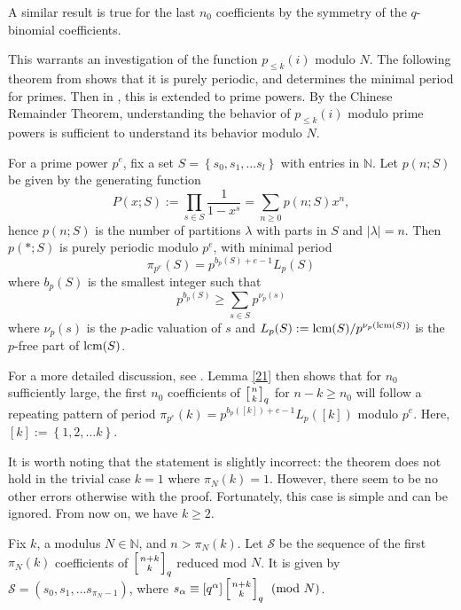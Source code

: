 \documentclass[12pt]{article}
\newcommand{\set}[1]{{\left\{{#1}\right\}}}
\newcommand{\N}{\mathbb{N}}
\newcommand{\qbinom}[2]{\left[{#1 \atop #2}\right]_q}
\newcommand{\eqdef}{:=}
\begin{document}
\begin{remark}
A similar result is true for the last $n_0$ coefficients by the symmetry of the $q$-binomial coefficients.
\end{remark}
This warrants an investigation of the function $p_{\le k}(i)$ modulo $N$. The following theorem from \cite{NijWilf} shows that it is purely periodic, and determines the minimal period for primes. Then in \cite{kwongpart}, this is extended to prime powers. By the Chinese Remainder Theorem, understanding the behavior of $p_{\le k}(i)$ modulo prime powers is sufficient to understand its behavior modulo $N$.

\begin{theorem}[Kwong]
For a prime power $p^e$, fix a set $S=\set{s_0, s_1, \ldots s_l}$ with entries in $\mathbb{N}$. Let $p(n;S)$ be given by the generating function
\[P(x;S) \eqdef \prod_{s\in S}{\frac{1}{1-x^s}} = \sum_{n\ge 0}{p(n;S)x^n},\]
hence $p(n;S)$ is the number of partitions $\lambda$ with parts in $S$ and $|\lambda |=n$. Then $p(*;S)$ is purely periodic modulo $p^e$, with minimal period 
\[\pi_{p^e}(S) = p^{b_p(S)+e-1} L_p(S)\] 
where $b_p(S)$ is the smallest integer such that 
\[p^{b_p(S)} \ge \sum_{s\in S}{p^{\nu_p(s)}}\]
where $\nu_p(s)$ is the $p$-adic valuation of $s$ and $L_p(S)\eqdef \textup{lcm}(S)/p^{\nu_p(\textup{lcm}(S))}$ is the $p$-free part of $\textup{lcm}(S)$.
\label{22}
\end{theorem}
For a more detailed discussion, see \cite{kwongpart}. Lemma \ref{21} then shows that for $n_0$ sufficiently large, the first $n_0$ coefficients of $\qbinom{n}{k}$ for $n-k\ge n_0$ will follow a repeating pattern of period $\pi_{p^e}(k)=p^{b_p([k])+e-1} L_p([k])$ modulo $p^e$. Here, $[k] \eqdef \set{1,2,\ldots k}$.

It is worth noting that the statement is slightly incorrect: the theorem does not hold in the trivial case $k=1$ where $\pi_N(k)=1$. However, there seem to be no other errors otherwise with the proof. Fortunately, this case is simple and can be ignored. From now on, we have $k\ge 2$.

\begin{definition}
Fix $k$, a modulus $N \in \N$, and $n > \pi_{N}(k)$. Let $\mathcal{S}$ be the sequence of the first $\pi_N(k)$ coefficients of $\qbinom{n+k}{k}$ reduced mod $N$. It is given by $\mathcal{S} = (s_0, s_1, \ldots s_{\pi_{N}-1})$, where
$s_\alpha \equiv  [q^\alpha]\qbinom{n+k}{k} \pmod{N}$.

\label{buf}
\end{definition}
\end{document}

